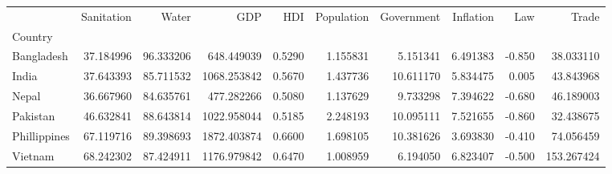 \documentclass{article}
\begin{document}
\begin{landscape}
\begin{tabular}{lrrrrrrrrr}
\toprule
\caption{\textbf{Table 3}}
\label{fig:universe}
\toprule
{} &  Sanitation &      Water &          GDP &     HDI &  Population &  Government &  Inflation &    Law &       Trade \\
Country      &             &            &              &         &             &             &            &        &             \\
\midrule
Bangladesh   &   37.184996 &  96.333206 &   648.449039 &  0.5290 &    1.155831 &    5.151341 &   6.491383 & -0.850 &   38.033110 \\
India        &   37.643393 &  85.711532 &  1068.253842 &  0.5670 &    1.437736 &   10.611170 &   5.834475 &  0.005 &   43.843968 \\
Nepal        &   36.667960 &  84.635761 &   477.282266 &  0.5080 &    1.137629 &    9.733298 &   7.394622 & -0.680 &   46.189003 \\
Pakistan     &   46.632841 &  88.643814 &  1022.958044 &  0.5185 &    2.248193 &   10.095111 &   7.521655 & -0.860 &   32.438675 \\
Phillippines &   67.119716 &  89.398693 &  1872.403874 &  0.6600 &    1.698105 &   10.381626 &   3.693830 & -0.410 &   74.056459 \\
Vietnam      &   68.242302 &  87.424911 &  1176.979842 &  0.6470 &    1.008959 &    6.194050 &   6.823407 & -0.500 &  153.267424 \\
\bottomrule
\end{tabular}
\end{landscape}
\end{document}
